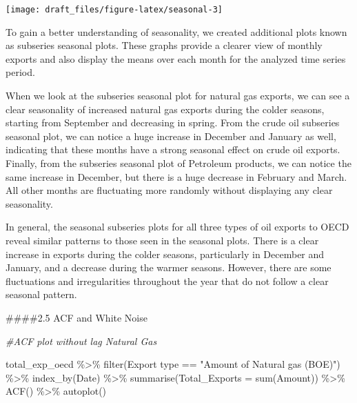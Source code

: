 \documentclass[
]{article}
\newenvironment{Shaded}{\begin{snugshade}}{\end{snugshade}}
\newcommand{\AttributeTok}[1]{\textcolor[rgb]{0.77,0.63,0.00}{#1}}
\newcommand{\CommentTok}[1]{\textcolor[rgb]{0.56,0.35,0.01}{\textit{#1}}}
\newcommand{\FunctionTok}[1]{\textcolor[rgb]{0.00,0.00,0.00}{#1}}
\newcommand{\NormalTok}[1]{#1}
\newcommand{\SpecialCharTok}[1]{\textcolor[rgb]{0.00,0.00,0.00}{#1}}
\newcommand{\StringTok}[1]{\textcolor[rgb]{0.31,0.60,0.02}{#1}}
\begin{document}
\begin{center}\texttt{[image: draft\_files/figure-latex/seasonal-3]} \end{center}

To gain a better understanding of seasonality, we created additional
plots known as subseries seasonal plots. These graphs provide a clearer
view of monthly exports and also display the means over each month for
the analyzed time series period.

When we look at the subseries seasonal plot for natural gas exports, we
can see a clear seasonality of increased natural gas exports during the
colder seasons, starting from September and decreasing in spring. From
the crude oil subseries seasonal plot, we can notice a huge increase in
December and January as well, indicating that these months have a strong
seasonal effect on crude oil exports. Finally, from the subseries
seasonal plot of Petroleum products, we can notice the same increase in
December, but there is a huge decrease in February and March. All other
months are fluctuating more randomly without displaying any clear
seasonality.

In general, the seasonal subseries plots for all three types of oil
exports to OECD reveal similar patterns to those seen in the seasonal
plots. There is a clear increase in exports during the colder seasons,
particularly in December and January, and a decrease during the warmer
seasons. However, there are some fluctuations and irregularities
throughout the year that do not follow a clear seasonal pattern.

\#\#\#\#2.5 ACF and White Noise

\begin{Shaded}
\begin{Highlighting}[]
\CommentTok{\#ACF plot without lag Natural Gas}

\NormalTok{total\_exp\_oecd }\SpecialCharTok{\%\textgreater{}\%} \FunctionTok{filter}\NormalTok{(}\StringTok{\textasciigrave{}}\AttributeTok{Export type}\StringTok{\textasciigrave{}} \SpecialCharTok{==} \StringTok{"Amount of Natural gas (BOE)"}\NormalTok{) }\SpecialCharTok{\%\textgreater{}\%} 
  \FunctionTok{index\_by}\NormalTok{(Date) }\SpecialCharTok{\%\textgreater{}\%} 
  \FunctionTok{summarise}\NormalTok{(}\AttributeTok{Total\_Exports =} \FunctionTok{sum}\NormalTok{(}\StringTok{\textasciigrave{}}\AttributeTok{Amount}\StringTok{\textasciigrave{}}\NormalTok{)) }\SpecialCharTok{\%\textgreater{}\%} 
  \FunctionTok{ACF}\NormalTok{() }\SpecialCharTok{\%\textgreater{}\%}  \FunctionTok{autoplot}\NormalTok{()}
\end{Highlighting}
\end{Shaded}
\end{document}
